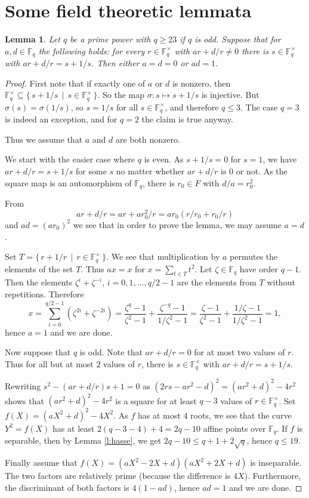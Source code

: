 \documentclass[12pt]{amsart}
\theoremstyle{plain}
\newtheorem{lemma}[theorem]{Lemma}
\theoremstyle{definition}
\numberwithin{equation}{section}
\newcommand*{\defset}[2]{\{\,#1\,\mid\,#2\,\}}
\newcommand{\FF}{\mathbb F}
\newcommand{\Fqs}{\FF_q^\times}
\begin{document}
\section{Some field theoretic lemmata}
\begin{lemma}
  Let $q$ be a prime power with $q\ge23$ if $q$ is odd. Suppose that
  for $a, d\in\FF_q$ the following holds: for every $r\in\Fqs$
  with $ar+d/r\ne0$ there is $s\in\Fqs$ with
  $ar+d/r=s+1/s$. Then either $a=d=0$ or $ad=1$.
\end{lemma}
\begin{proof}
First note that if exactly one of $a$ or $d$ is nonzero, then
$\Fqs\subseteq\defset{s+1/s}{s\in\Fqs}$. So the map
$\sigma: s\mapsto s+1/s$ is injective. But $\sigma(s)=\sigma(1/s)$, so
$s=1/s$ for all $s\in\Fqs$, and therefore $q\leq3$. The
case $q=3$ is indeed an exception, and for $q=2$ the claim is true
anyway.

Thus we assume that $a$ and $d$ are both nonzero.
  
We start with the easier case where $q$ is even. As $s+1/s=0$ for
$s=1$, we have $ar+d/r=s+1/s$ for some $s$ no matter whether $ar+d/r$
is $0$ or not. As the square map is an automorphism of $\FF_q$, there
is $r_0\in F$ with $d/a=r_0^2$.
  
From%
\[
  ar+d/r=ar+ar_0^2/r=ar_0(r/r_0+r_0/r)
\]
and $ad=(ar_0)^2$ we see that in order to prove the lemma, we may
assume $a=d$. 

Set $T=\defset{r+1/r}{r\in\Fqs}$. We see that multiplication by
$a$ permutes the elements of the set $T$. Thus $ax=x$ for
$x=\sum_{t\in T}t^2$. Let $\zeta\in\FF_q$ have order $q-1$. Then the
elements $\zeta^i+\zeta^{-i}$, $i=0,1,\dots,q/2-1$ are the elements
from $T$ without repetitions. Therefore
  \[
    x = \sum_{i=0}^{q/2-1}(\zeta^{2i}+\zeta^{-2i})%
    =
    \frac{\zeta^q-1}{\zeta^2-1}+\frac{\zeta^{-q}-1}{1/\zeta^2-1}%
    =\frac{\zeta-1}{\zeta^2-1}+\frac{1/\zeta-1}{1/\zeta^2-1}=1,
  \]
  hence $a=1$ and we are done.

  Now suppose that $q$ is odd. Note that $ar+d/r=0$ for at most two
  values of $r$. Thus for all but at most $2$ values of $r$, there is
  $s\in\Fqs$ with $ar+d/r=s+1/s$.

  Rewriting $s^2-(ar+d/r)s+1=0$ as $(2rs-ar^2-d)^2=(ar^2+d)^2-4r^2$
  shows that $(ar^2+d)^2-4r^2$ is a square for at least $q-3$ values
  of $r\in\Fqs$. Set $f(X)=(aX^2+d)^2-4X^2$. As $f$ has at most
  $4$ roots, we see that the curve $Y^2=f(X)$ has at least
  $2(q-3-4)+4=2q-10$ affine points over $\FF_q$. If $f$ is separable,
  then by Lemma \ref{l:hasse}, we get $2q-10\le q+1+2\sqrt{q}$, hence
  $q\le19$.

  Finally assume that $f(X)=(aX^2-2X+d)(aX^2+2X+d)$ is
  inseparable. The two factors are relatively prime (because the
  difference is $4X$). Furthermore, the discriminant of both factors
  is $4(1-ad)$, hence $ad=1$ and we are done.
\end{proof}
\end{document}
